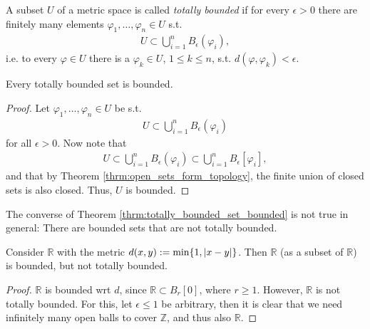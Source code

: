 \begin{defn}
	A subset $U$ of a metric space is called \textit{totally bounded} if for every $\epsilon > 0$ there are finitely many elements $\varphi_1, \dots, \varphi_n\in U$ s.t. 
	\begin{align*}
		U\subset \bigcup_{i = 1}^{n}B_{\epsilon}(\varphi_i),
	\end{align*}
	i.e. to every $\varphi\in U$ there is a $\varphi_k\in U$, $1\leq k\leq n$, s.t. $d(\varphi, \varphi_k) < \epsilon$.
\end{defn}

\begin{theorem}\label{thrm:totally_bounded_set_bounded}
	Every totally bounded set is bounded.
\end{theorem}

\begin{proof}
	Let $\varphi_1, \dots, \varphi_n\in U$ be s.t.
	\begin{align*}
		U\subset \bigcup_{i = 1}^{n}B_{\epsilon}(\varphi_i)
	\end{align*}
	for all $\epsilon > 0$. Now note that
	\begin{align*}
		U\subset \bigcup_{i = 1}^{n}B_{\epsilon}(\varphi_i) \subset \bigcup_{i = 1}^{n}B_{\epsilon}[\varphi_i],
	\end{align*}
	and that by Theorem \ref{thrm:open_sets_form_topology}, the finite union of closed sets is also closed. Thus, $U$ is bounded.
\end{proof}

\begin{remark}
	The converse of Theorem \ref{thrm:totally_bounded_set_bounded} is not true in general: There are bounded sets that are not totally bounded.
\end{remark}

\begin{exmp}
	Consider $\mathbb R$ with the metric $d(x, y) := \min\{ 1, \left\vert x - y \right\vert \}$. Then $\mathbb R$ (as a subset of $\mathbb R$) is bounded, but not totally bounded.
\end{exmp}

\begin{proof}
	$\mathbb R$ is bounded wrt $d$, since $\mathbb R \subset B_{r}[0]$, where $r \geq 1$. However, $\mathbb R$ is not totally bounded. For this, let $\epsilon\leq 1$ be arbitrary, then it is clear that we need infinitely many open balls to cover $\mathbb Z$, and thus also $\mathbb R$.
\end{proof}

